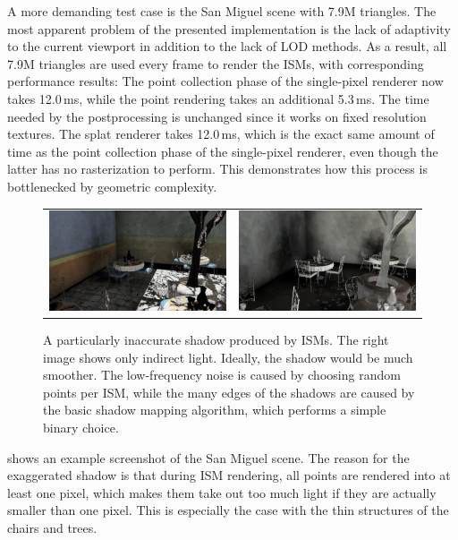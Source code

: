 A more demanding test case is the San Miguel scene with 7.9M triangles. The most apparent problem of the presented implementation is the lack of adaptivity to the current viewport in addition to the lack of LOD methods. As a result, all 7.9M triangles are used every frame to render the ISMs, with corresponding performance results: The point collection phase of the single-pixel renderer now takes 12.0\,ms, while the point rendering takes an additional 5.3\,ms. The time needed by the postprocessing is unchanged since it works on fixed resolution textures. The splat renderer takes 12.0\,ms, which is the exact same amount of time as the point collection phase of the single-pixel renderer, even though the latter has no rasterization to perform. This demonstrates how this process is bottlenecked by geometric complexity.

\begin{figure}[b]
\centering
  \begin{tabular}{@{}cc@{}}
    \includegraphics[width=.48\textwidth]{screenshots/san_miguel_ugly_shadow} &
    \includegraphics[width=.48\textwidth]{screenshots/san_miguel_ugly_shadow_gi_only}
  \end{tabular}
  \caption{A particularly inaccurate shadow produced by ISMs. The right image shows only indirect light. Ideally, the shadow would be much smoother. The low-frequency noise is caused by choosing random points per ISM, while the many edges of the shadows are caused by the basic shadow mapping algorithm, which performs a simple binary choice.}
  \label{fig:results:san_miguel_ugly_shadow}
\end{figure}

 shows an example screenshot of the San Miguel scene. The reason for the exaggerated shadow is that during ISM rendering, all points are rendered into at least one pixel, which makes them take out too much light if they are actually smaller than one pixel. This is especially the case with the thin structures of the chairs and trees.


